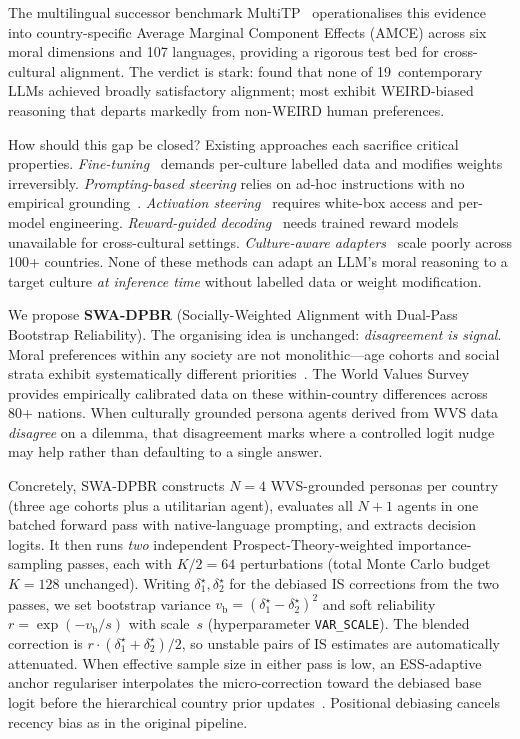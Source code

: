 \documentclass{article}
\begin{document}
The multilingual successor benchmark MultiTP~\citep{jin2025multitp} operationalises
this evidence into country-specific Average Marginal Component Effects (AMCE)
across six moral dimensions and 107 languages, providing a rigorous test bed for
cross-cultural alignment. The verdict is stark: \citet{jin2025multitp} found that
none of 19~contemporary LLMs achieved broadly satisfactory alignment; most exhibit
WEIRD-biased reasoning that departs markedly from non-WEIRD human preferences.

How should this gap be closed? Existing approaches each sacrifice critical properties.
\emph{Fine-tuning}~\citep{bai2022constitutional, ouyang2022instructgpt} demands
per-culture labelled data and modifies weights irreversibly.
\emph{Prompting-based steering} relies on ad-hoc instructions with no empirical
grounding~\citep{jin2025multitp}.
\emph{Activation steering}~\citep{arditi2025refusal, zou2023representation} requires
white-box access and per-model engineering.
\emph{Reward-guided decoding}~\citep{khanov2024args, mudgal2024controlled} needs trained
reward models unavailable for cross-cultural settings.
\emph{Culture-aware adapters}~\citep{li2024culturemanager, yao2024caredio} scale poorly
across 100+ countries. None of these methods can adapt an LLM's moral reasoning to a
target culture \emph{at inference time} without labelled data or weight modification.

We propose \textbf{SWA-DPBR} (Socially-Weighted Alignment with Dual-Pass Bootstrap
Reliability). The organising idea is unchanged: \emph{disagreement is signal}.
Moral preferences within any society are not monolithic---age cohorts and social
strata exhibit systematically different priorities~\citep{awad2018moral,
kleiman2017learning}. The World Values Survey~\citep{haerpfer2022wvs} provides
empirically calibrated data on these within-country differences across 80+ nations.
When culturally grounded persona agents derived from WVS data \emph{disagree} on a
dilemma, that disagreement marks where a controlled logit nudge may help rather
than defaulting to a single answer.

Concretely, SWA-DPBR constructs $N=4$ WVS-grounded personas per country (three
age cohorts plus a utilitarian agent), evaluates all $N+1$ agents in one batched
forward pass with native-language prompting, and extracts decision logits. It then
runs \emph{two} independent Prospect-Theory-weighted importance-sampling passes,
each with $K/2{=}64$ perturbations (total Monte Carlo budget $K{=}128$ unchanged).
Writing
$\delta^\star_1,\delta^\star_2$ for the debiased IS corrections from the two passes,
we set bootstrap variance $v_{\mathrm{b}}=(\delta^\star_1-\delta^\star_2)^2$ and
soft reliability $r=\exp(-v_{\mathrm{b}}/s)$ with scale~$s$ (hyperparameter
\texttt{VAR\_SCALE}). The blended correction is $r\cdot(\delta^\star_1+\delta^\star_2)/2$,
so unstable pairs of IS estimates are automatically attenuated. When effective sample
size in either pass is low, an ESS-adaptive anchor regulariser interpolates the
micro-correction toward the debiased base logit before the hierarchical country
prior updates~\citep{kahneman1979prospect}. Positional debiasing cancels recency
bias as in the original pipeline.
\end{document}
